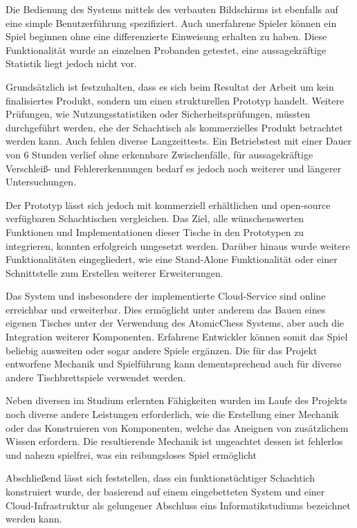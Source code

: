 Die Bedienung des Systems mittels des verbauten Bildschirms ist
ebenfalls auf eine simple Benutzerführung spezifiziert. Auch unerfahrene
Spieler können ein Spiel beginnen ohne eine differenzierte Einweisung
erhalten zu haben. Diese Funktionalität wurde an einzelnen Probanden
getestet, eine aussagekräftige Statistik liegt jedoch nicht vor.

Grundsätzlich ist festzuhalten, dass es sich beim Resultat der Arbeit um
kein finalisiertes Produkt, sondern um einen strukturellen Prototyp
handelt. Weitere Prüfungen, wie Nutzungsstatistiken oder
Sicherheitsprüfungen, müssten durchgeführt werden, ehe der Schachtisch
als kommerzielles Produkt betrachtet werden kann. Auch fehlen diverse
Langzeittests. Ein Betriebstest mit einer Dauer von 6 Stunden verlief
ohne erkennbare Zwischenfälle, für aussagekräftige Verschleiß- und
Fehlererkennungen bedarf es jedoch noch weiterer und längerer
Untersuchungen.

Der Prototyp lässt sich jedoch mit kommerziell erhältlichen und
open-source verfügbaren Schachtischen vergleichen. Das Ziel, alle
wünschenswerten Funktionen und Implementationen dieser Tische in den
Prototypen zu integrieren, konnten erfolgreich umgesetzt werden. Darüber
hinaus wurde weitere Funktionalitäten eingegliedert, wie eine
Stand-Alone Funktionalität oder einer Schnittstelle zum Erstellen
weiterer Erweiterungen.

Das System und insbesondere der implementierte Cloud-Service sind online
erreichbar und erweiterbar. Dies ermöglicht unter anderem das Bauen
eines eigenen Tisches unter der Verwendung des AtomicChess Systems, aber
auch die Integration weiterer Komponenten. Erfahrene Entwickler können
somit das Spiel beliebig ausweiten oder sogar andere Spiele ergänzen.
Die für das Projekt entworfene Mechanik und Spielführung kann
dementsprechend auch für diverse andere Tischbrettspiele verwendet
werden.

Neben diversen im Studium erlernten Fähigkeiten wurden im Laufe des
Projekts noch diverse andere Leistungen erforderlich, wie die Erstellung
einer Mechanik oder das Konstruieren von Komponenten, welche das
Aneignen von zusätzlichem Wissen erfordern. Die resultierende Mechanik
ist ungeachtet dessen ist fehlerlos und nahezu spielfrei, was ein
reibungsloses Spiel ermöglicht

Abschließend lässt sich feststellen, dass ein funktionstüchtiger
Schachtich konstruiert wurde, der basierend auf einem eingebetteten
System und einer Cloud-Infrastruktur als gelungener Abschluss eins
Informatikstudiums bezeichnet werden kann.

